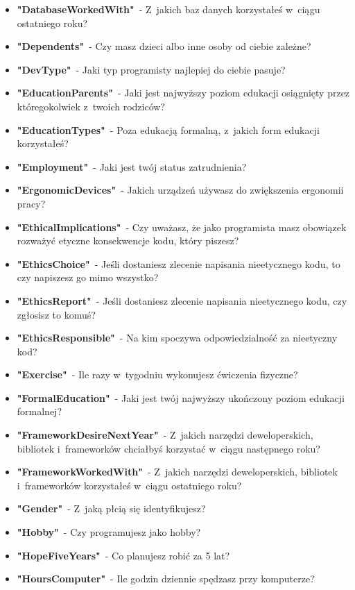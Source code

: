 \begin{appendices}
\begin{itemize}
        \item \textbf{"DatabaseWorkedWith"}~- Z~jakich baz danych korzystałeś w~ciągu ostatniego roku?
        \item \textbf{"Dependents"}~- Czy masz dzieci albo inne osoby od ciebie zależne?
        \item \textbf{"DevType"}~- Jaki typ programisty najlepiej do ciebie pasuje?
        \item \textbf{"EducationParents"}~- Jaki jest najwyższy poziom edukacji osiągnięty przez któregokolwiek z~twoich rodziców?
        \item \textbf{"EducationTypes"}~- Poza edukacją formalną, z~jakich form edukacji korzystałeś?
        \item \textbf{"Employment"}~- Jaki jest twój status zatrudnienia?
        \item \textbf{"ErgonomicDevices"}~- Jakich urządzeń używasz do zwiększenia ergonomii pracy?
        \item \textbf{"EthicalImplications"}~- Czy uważasz, że jako programista masz obowiązek rozważyć etyczne konsekwencje kodu, który piszesz?
        \item \textbf{"EthicsChoice"}~- Jeśli dostaniesz zlecenie napisania nieetycznego kodu, to czy napiszesz go mimo wszystko?
        \item \textbf{"EthicsReport"}~- Jeśli dostaniesz zlecenie napisania nieetycznego kodu, czy zgłosisz to komuś?
        \item \textbf{"EthicsResponsible"}~- Na kim spoczywa odpowiedzialność za nieetyczny kod?
        \item \textbf{"Exercise"}~- Ile razy w~tygodniu wykonujesz ćwiczenia fizyczne?
        \item \textbf{"FormalEducation"}~- Jaki jest twój najwyższy ukończony poziom edukacji formalnej?
        \item \textbf{"FrameworkDesireNextYear"}~- Z~jakich narzędzi deweloperskich, bibliotek i~frameworków chciałbyś korzystać w~ciągu następnego roku?
        \item \textbf{"FrameworkWorkedWith"}~- Z~jakich narzędzi deweloperskich, bibliotek i~frameworków korzystałeś w~ciągu ostatniego roku?
        \item \textbf{"Gender"}~- Z~jaką płcią się identyfikujesz?
        \item \textbf{"Hobby"}~- Czy programujesz jako hobby?
        \item \textbf{"HopeFiveYears"}~- Co planujesz robić za 5 lat?
        \item \textbf{"HoursComputer"}~- Ile godzin dziennie spędzasz przy komputerze?

\end{itemize}
\end{appendices}
